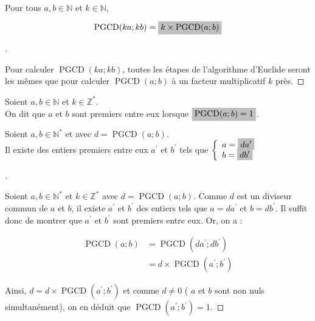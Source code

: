 \documentclass[12pt]{article}
\newcommand{\hideM}[1]{\mbox{\vphantom{$#1$}\smash{\colorbox{gray!50}{$\displaystyle #1$}}} }
\theoremstyle{break}
\newenvironment{demo}[1][\proofname]{%
  \begin{proof}[#1]$ $\newline
}{%
  \end{proof}
}
\begin{document}
\begin{proposition}{}{}
Pour tous $a, b \in \mathbb{N}$ et $k \in \mathbb{N}$,

$$
\operatorname{PGCD}(k a ; k b)=\hideM{k \times \operatorname{PGCD}(a ; b)}
$$
\end{proposition}

\begin{demo}
Pour calculer $\operatorname{PGCD}(k a ; k b)$, toutes les étapes de l'algorithme d'Euclide seront les mêmes que pour calculer $\operatorname{PGCD}(a ; b)$ à un facteur multiplicatif $k$ près.
\end{demo}

\begin{definition}{}{}
Soient $a, b \in \mathbb{N}$ et $k \in \mathbb{Z}^{*}$.\\
On dit que $a$ et $b$ sont premiers entre eux lorsque $\hideM{\operatorname{PGCD}(a ; b)=1}$.
\end{definition}

\begin{proposition}{}{}
Soient $a, b \in \mathbb{N}^{*}$ et avec $d=\operatorname{PGCD}(a ; b)$.\\
Il existe des entiers premiers entre eux $a^{\prime}$ et $b^{\prime}$ tels que $\left\{\begin{array}{l}a=\hideM{d a^{\prime}} \\ b=\hideM{d b^{\prime}}\end{array}\right.$
\end{proposition}

\begin{demo}
Soient $a, b \in \mathbb{N}^{*}$ et $k \in \mathbb{Z}^{*}$ avec $d=\operatorname{PGCD}(a ; b)$. Comme $d$ est un diviseur commun de $a$ et $b$, il existe $a^{\prime}$ et $b^{\prime}$ des entiers tels que $a=d a^{\prime}$ et $b=d b^{\prime}$. Il suffit donc de montrer que $a^{\prime}$ et $b^{\prime}$ sont premiers entre eux. Or, on a :

$$
\begin{aligned}
\operatorname{PGCD}(a ; b) & =\operatorname{PGCD}\left(d a^{\prime} ; d b^{\prime}\right) \\
& =d \times \operatorname{PGCD}\left(a^{\prime} ; b^{\prime}\right)
\end{aligned}
$$

Ainsi, $d=d \times \operatorname{PGCD}\left(a^{\prime} ; b^{\prime}\right)$ et comme $d \neq 0$ ( $a$ et $b$ sont non nuls simultanément), on en déduit que $\operatorname{PGCD}\left(a^{\prime} ; b^{\prime}\right)=1$.
\end{demo}
\end{document}
